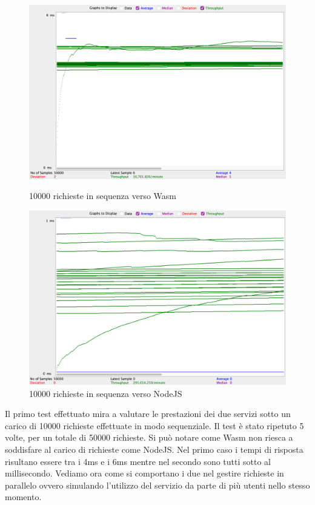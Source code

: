 \begin{figure}[!htb]
        \includegraphics[width=\linewidth]{chapters/3.poc/benchmarks_images/wasi_10000_single_req.png}
        \caption{10000 richieste in sequenza verso Wasm}\label{fig:10000_req_wasi} \endminipage\hfill
        \includegraphics[width=\linewidth]{chapters/3.poc/benchmarks_images/node_10000_single_req.png}
        \caption{10000 richieste in sequenza verso NodeJS}\label{fig:10000_req_node} \endminipage\hfill
\end{figure}

Il primo test effettuato mira a valutare le prestazioni dei due servizi sotto un carico di 10000 richieste effettuate in
modo sequenziale. Il test è stato ripetuto 5 volte, per un totale di 50000 richieste. Si può notare come Wasm non riesca
a soddisfare al carico di richieste come NodeJS. Nel primo caso i tempi di risposta risultano essere tra i 4ms e i 6ms
mentre nel secondo sono tutti sotto al millisecondo. Vediamo ora come si comportano i due nel gestire richieste in
parallelo ovvero simulando l'utilizzo del servizio da parte di più utenti nello stesso momento.

